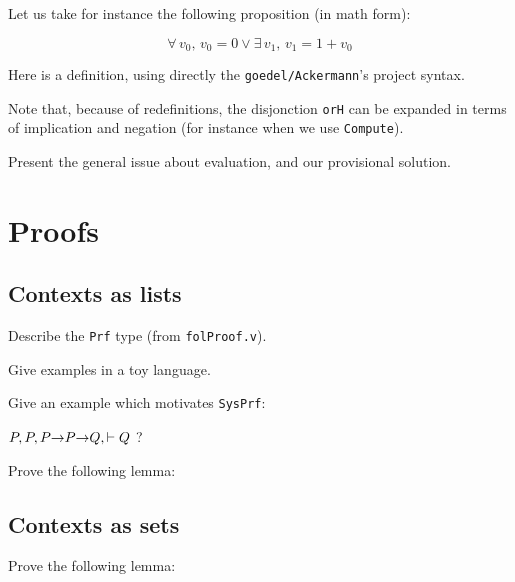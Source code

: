 Let us take for instance the following proposition (in math form):

$$\forall\, v_0,\, v_0=0\vee \exists\,v_1,\,v_1=1+v_0$$

Here is a definition, using directly the \texttt{goedel/Ackermann}'s project syntax.


Note that, because of redefinitions, the disjonction \texttt{orH}
can be expanded in terms of  implication and negation (for instance when we use \texttt{Compute}).

\begin{todo}
  Present the general issue about evaluation, and our provisional solution.
\end{todo}






\section{Proofs}

\subsection{Contexts as lists}
\begin{todo}
Describe the \texttt{Prf} type (from \texttt{folProof.v}).

Give examples in a toy language.

Give an example which motivates \texttt{SysPrf}:

$P,P , P\mbox{$\rightarrow$} P \mbox{$\rightarrow$} Q, \vdash Q$ ?
\end{todo}

\begin{exercise}

Prove the following lemma:

\end{exercise}

\subsection{Contexts as sets}

\begin{exercise}

Prove the following lemma:

\end{exercise}


